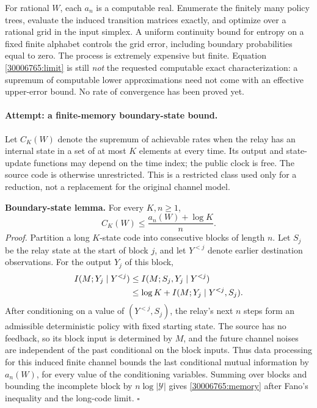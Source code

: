 \documentclass[11pt,a4paper]{article}
\numberwithin{equation}{section}
\begin{document}
For rational $W$, each $a_n$ is a computable real. Enumerate the finitely
many policy trees, evaluate the induced transition matrices exactly,
and optimize over a rational grid in the input simplex. A uniform
continuity bound for entropy on a fixed finite alphabet controls the
grid error, including boundary probabilities equal to zero. The process
is extremely expensive but finite. Equation \eqref{30006765:limit} is still
\emph{not} the requested computable exact characterization: a supremum
of computable lower approximations need not come with an effective
upper-error bound. No rate of convergence has been proved yet.

\paragraph{Attempt: a finite-memory boundary-state bound.}
Let $C_K(W)$ denote the supremum of achievable rates when the relay
has an internal state in a set of at most $K$ elements at every time.
Its output and state-update functions may depend on the time index;
the public clock is free. The source code is otherwise unrestricted.
This is a restricted class used only for a reduction, not a replacement
for the original channel model.

\textbf{Boundary-state lemma.} For every $K,n\geq1$,
\begin{equation}\label{30006765:memory}
 C_K(W)\leq\frac{a_n(W)+\log K}{n}.
\end{equation}
\emph{Proof.} Partition a long $K$-state code into consecutive blocks
of length $n$. Let $S_j$ be the relay state at the start of block $j$,
and let $Y^{<j}$ denote earlier destination observations. For the output
$Y_j$ of this block,
\begin{align}
 I(M;Y_j\mid Y^{<j})
 &\leq I(M;S_j,Y_j\mid Y^{<j})\notag\\
 &\leq\log K+I(M;Y_j\mid Y^{<j},S_j).
\end{align}
After conditioning on a value of $(Y^{<j},S_j)$, the relay's next $n$
steps form an admissible deterministic policy with fixed starting
state. The source has no feedback, so its block input is determined
by $M$, and the future channel noises are independent of the past
conditional on the block inputs. Thus data processing for this induced
finite channel bounds the last conditional mutual information by
$a_n(W)$, for every value of the conditioning variables. Summing over
blocks and bounding the incomplete block by $n\log|\mathcal Y|$ gives
\eqref{30006765:memory} after Fano's inequality and the long-code limit.
\hfill$\square$
\end{document}
